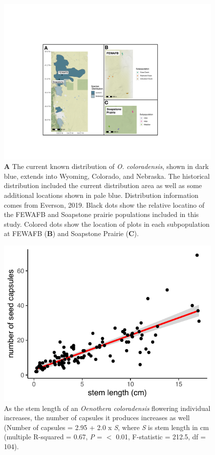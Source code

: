 \documentclass[12pt, letterpaper]{article}
\begin{document}
\begin{figure}[h]
    \centering
    \includegraphics[width = 1\textwidth]{figures/COBP_mapFigure.pdf}
    \caption{\textbf{A} The current known distribution of \textit{O. coloradensis}, shown in dark blue, extends into Wyoming, Colorado, and Nebraska. The historical distribution included the current distribution area as well as some additional locations shown in pale blue. Distribution information comes from Everson, 2019. Black dots show the relative locatino of the FEWAFB and Soapstone prairie populations included in this study. Colored dots show the location of plots in each subpopulation at FEWAFB (\textbf{B}) and Soapstone Prairie (\textbf{C}).}
    \label{fig:plotMap}
\end{figure}

\begin{figure}[h]
  \centering
  \includegraphics[width=.7\textwidth]{seedRegressionFigure.pdf}
  \caption{As the stem length of an \textit{Oenothera coloradensis} flowering individual increases, the number of capsules it produces increases as well (Number of capsules = 2.95 + 2.0 \textsf{x} \textit{S}, where \textit{S} is stem length in cm (multiple R-squared = 0.67, \textit{P} = $<$ 0.01, F-statistic = 212.5, df = 104).  }
  \label{fig:seedRegression}
\end{figure} 
\end{document}
